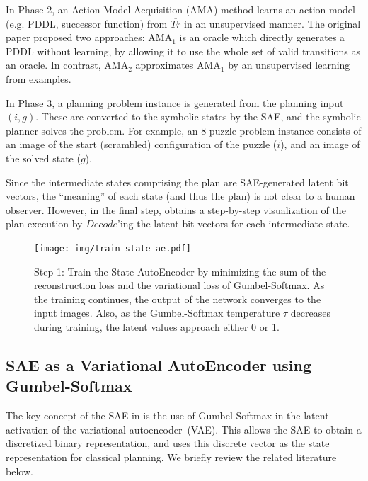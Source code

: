 In Phase 2, an Action Model Acquisition (AMA) method learns an action model (e.g. PDDL, successor function) from $\overline{Tr}$ in an unsupervised manner.
The original paper proposed two approaches: AMA$_1$ is an oracle which directly generates a PDDL without learning,
by allowing it to use the whole set of valid transitions as an oracle.
In contrast, AMA$_2$ approximates AMA$_1$ by an unsupervised learning from examples.

In Phase 3, a planning problem instance is generated from the planning input $(i,g)$.
These are converted to the symbolic states by the SAE, and the symbolic planner solves the problem.
For example, an 8-puzzle problem instance consists of an image of the start (scrambled) configuration of the puzzle ($i$), and an image of the solved state ($g$).

Since the intermediate states comprising the plan are SAE-generated latent bit vectors, the ``meaning'' of each state (and thus the plan) is not clear to a human observer.
However, in the final step, \latentplanner obtains a step-by-step visualization of the plan execution
by $Decode$'ing the latent bit vectors for each intermediate state.

\begin{figure}[tb]
 \texttt{[image: img/train-state-ae.pdf]}
 \caption{Step 1:
Train the State AutoEncoder by
 minimizing the sum of the reconstruction loss and the variational loss of Gumbel-Softmax.
As the training continues, the output of the network converges to the input images.
Also, as the Gumbel-Softmax temperature $\tau$ decreases during training,
the latent values approach either 0 or 1.}
 \label{sae}
\end{figure}

\subsection{SAE as a Variational AutoEncoder using Gumbel-Softmax}

The key concept of the SAE in \latentplanner is the use of Gumbel-Softmax \cite{jang2016categorical}
in the latent activation of the variational autoencoder~(VAE).
This allows the SAE to obtain a discretized binary representation, and \latentplanner uses this
discrete vector as the state representation for classical planning.
We briefly review the related literature below.

